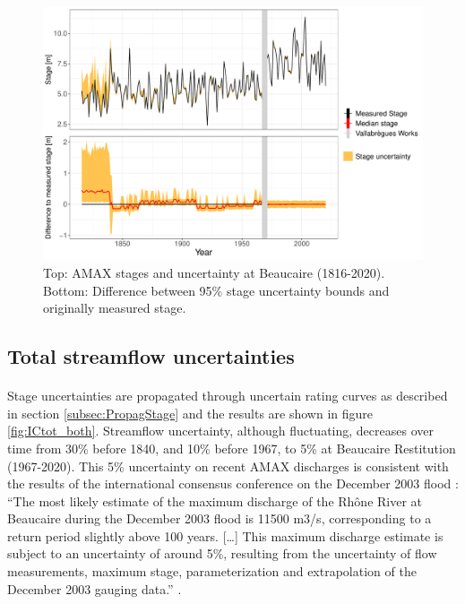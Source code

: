 \documentclass[11pt]{article}
\begin{document}
    \begin{figure}[h!]
        \centering
        \includegraphics[width=0.9\linewidth]{Figs/8-StageErrorAMAX_BOTH.pdf}\hfill
        \caption{Top: AMAX stages and uncertainty at Beaucaire (1816-2020). Bottom: Difference between 95\% stage uncertainty bounds and originally measured stage.}
        \label{fig:StageErrAMAX}
    \end{figure}
  \FloatBarrier

    \subsection{Total streamflow uncertainties}
    
    \paragraph{}
    Stage uncertainties are propagated through uncertain rating curves as described in section \ref{subsec:PropagStage} and the results are shown in figure \ref{fig:ICtot_both}. Streamflow uncertainty, although fluctuating, decreases over time from 30\% before 1840, and 10\% before 1967, to 5\% at Beaucaire Restitution (1967-2020). This 5\% uncertainty on recent AMAX discharges is consistent with the results of the international consensus conference on the December 2003 flood : “The most likely estimate of the maximum discharge of the Rhône River at Beaucaire during the December 2003 flood is 11500 m3/s, corresponding to a return period slightly above 100 years. […] This maximum discharge estimate is subject to an uncertainty of around 5\%, resulting from the uncertainty of flow measurements, maximum stage, parameterization and extrapolation of the December 2003 gauging data.” \citep{medd_debit_2005}.
    
\end{document}
